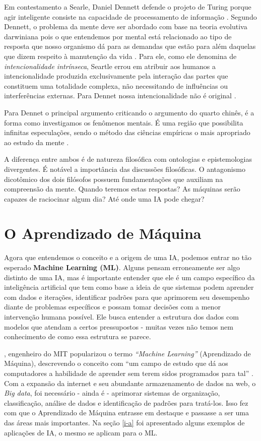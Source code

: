 \documentclass[
  openany]{book}
\begin{document}
Em contestamento a Searle, Daniel Dennett defende o projeto de Turing porque agir inteligente consiste na capacidade de processamento de informação \citep{dennett2009part}. Segundo Dennett, o problema da mente deve ser abordado com base na teoria evolutiva darwiniana pois o que entendemos por mental está relacionado ao tipo de resposta que nosso organismo dá para as demandas que estão para além daquelas que dizem respeito à manutenção da vida \citep{da2013searle}. Para ele, como ele denomina de \emph{intencionalidade intrínseca}, Seartle errou em atribuir aos humanos a intencionalidade produzida exclusivamente pela interação das partes que constituem uma totalidade complexa, não necessitando de influências ou interferências externas. Para Dennet nossa intencionalidade não é original \citep{dennett2009part}.

Para Dennet o principal argumento criticando o argumento do quarto chinês, é a forma como investigamos os fenômenos mentais. É uma região que possibilita infinitas especulações, sendo o método das ciências empíricas o mais apropriado ao estudo da mente \citep{da2013searle}.

A diferença entre ambos é de natureza filosófica com ontologias e epistemologias divergentes. É notável a importância das discussões filosóficas. O antagonismo dicotômico dos dois filósofos possuem fundamentações que auxiliam na compreensão da mente. Quando teremos estas respostas? As máquinas serão capazes de raciocinar algum dia? Até onde uma IA pode chegar?

\hypertarget{machinelearning}{%
\chapter{O Aprendizado de Máquina}\label{machinelearning}}

Agora que entendemos o conceito e a origem de uma IA, podemos entrar no tão esperado \textbf{Machine Learning (ML)}. Alguns pensam erroneamente ser algo distinto de uma IA, mas é importante entender que ele é um campo específico da inteligência artificial que tem como base a ideia de que sistemas podem aprender com dados e iterações, identificar padrões para que aprimorem seu desempenho diante de problemas específicos e possam tomar decisões com a menor intervenção humana possível. Ele busca entender a estrutura dos dados com modelos que atendam a certos pressupostos - muitas vezes não temos nem conhecimento de como essa estrutura se parece.

\citet{samuel1959some}, engenheiro do MIT popularizou o termo \emph{``Machine Learning''} (Aprendizado de Máquina), descrevendo o conceito com ``um campo de estudo que dá aos computadores a habilidade de aprender sem terem sidos programados para tal'' \citep{simon2013too}. Com a expansão da internet e seu abundante armazenamento de dados na web, o \emph{Big data}, foi necessário - ainda é - aprimorar sistemas de organização, classificação, análise de dados e identificação de padrões para tratá-los. Isso fez com que o Aprendizado de Máquina entrasse em destaque e passasse a ser uma das áreas mais importantes. Na seção \ref{i-a} foi apresentado alguns exemplos de aplicações de IA, o mesmo se aplicam para o ML.
\end{document}
